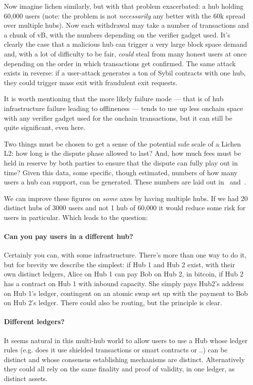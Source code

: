 \documentclass[11pt]{article}
\begin{document}
Now imagine lichen similarly, but with that problem exacerbated: a hub holding 60,000 users (note: the problem is not \emph{necessarily} any better with the 60k spread over multiple hubs). Now each withdrawal may take a number of transactions and a chunk of vB, with the numbers depending on the verifier gadget used. It's clearly the case that a malicious hub can trigger a very large block space demand and, with a lot of difficulty to be fair, \emph{could} steal from many honest users at once depending on the order in which transactions get confirmed. The same attack exists in reverse: if a user-attack generates a ton of Sybil contracts with one hub, they could trigger mass exit with fraudulent exit requests.

It is worth mentioning that the more likely failure mode --- that is of hub infrastructure failure leading to offlineness --- tends to use up less onchain space with any verifier gadget used for the onchain transactions, but it can still be quite significant, even here.

Two things must be chosen to get a sense of the potential safe scale of a Lichen L2: how long is the dispute phase allowed to last? And, how much fees must be held in reserve by both parties to ensure that the dispute can fully play out in time? Given this data, some specific, though estimated, numbers of how many users a hub can support, can be generated. These numbers are laid out in~\cite{lichenbitvmx} and~\cite{lichenbabe}.

We can improve these figures on \emph{some} axes by having multiple hubs. If we had 20 distinct hubs of 3000 users and not 1 hub of 60,000 it would reduce some risk for users in particular. Which leads to the question:

\paragraph{ Can you pay users in a different hub?} Certainly you can, with some infrastructure. There's more than one way to do it, but for brevity we describe the simplest: if Hub 1 and Hub 2 exist, with their own distinct ledgers, Alice on Hub 1 can pay Bob on Hub 2, in bitcoin, if Hub 2 has a contract on Hub 1 with inbound capacity. She simply pays Hub2's address on Hub 1's ledger, contingent on an atomic swap set up with the payment to Bob on Hub 2's ledger. There could also be routing, but the principle is clear.

\paragraph{Different ledgers?} It seems natural in this multi-hub world to allow users to use a Hub whose ledger rules (e.g. does it use shielded transactions or smart contracts or ..) can be distinct and whose consensus establishing mechanisms are distinct. Alternatively they could all rely on the same finality and proof of validity, in one ledger, as distinct assets.
\end{document}

